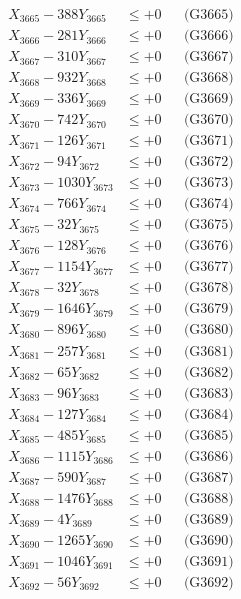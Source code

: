 \documentclass[a4paper,10pt]{article}
\begin{document}
{\begin{align}
X_{3665} - 388Y_{3665} &\leq +0 && \text{(G3665)} \\
X_{3666} - 281Y_{3666} &\leq +0 && \text{(G3666)} \\
X_{3667} - 310Y_{3667} &\leq +0 && \text{(G3667)} \\
X_{3668} - 932Y_{3668} &\leq +0 && \text{(G3668)} \\
X_{3669} - 336Y_{3669} &\leq +0 && \text{(G3669)} \\
X_{3670} - 742Y_{3670} &\leq +0 && \text{(G3670)} \\
\allowbreak
X_{3671} - 126Y_{3671} &\leq +0 && \text{(G3671)} \\
X_{3672} - 94Y_{3672} &\leq +0 && \text{(G3672)} \\
X_{3673} - 1030Y_{3673} &\leq +0 && \text{(G3673)} \\
X_{3674} - 766Y_{3674} &\leq +0 && \text{(G3674)} \\
X_{3675} - 32Y_{3675} &\leq +0 && \text{(G3675)} \\
X_{3676} - 128Y_{3676} &\leq +0 && \text{(G3676)} \\
X_{3677} - 1154Y_{3677} &\leq +0 && \text{(G3677)} \\
X_{3678} - 32Y_{3678} &\leq +0 && \text{(G3678)} \\
X_{3679} - 1646Y_{3679} &\leq +0 && \text{(G3679)} \\
X_{3680} - 896Y_{3680} &\leq +0 && \text{(G3680)} \\
\allowbreak
X_{3681} - 257Y_{3681} &\leq +0 && \text{(G3681)} \\
X_{3682} - 65Y_{3682} &\leq +0 && \text{(G3682)} \\
X_{3683} - 96Y_{3683} &\leq +0 && \text{(G3683)} \\
X_{3684} - 127Y_{3684} &\leq +0 && \text{(G3684)} \\
X_{3685} - 485Y_{3685} &\leq +0 && \text{(G3685)} \\
X_{3686} - 1115Y_{3686} &\leq +0 && \text{(G3686)} \\
X_{3687} - 590Y_{3687} &\leq +0 && \text{(G3687)} \\
X_{3688} - 1476Y_{3688} &\leq +0 && \text{(G3688)} \\
X_{3689} - 4Y_{3689} &\leq +0 && \text{(G3689)} \\
X_{3690} - 1265Y_{3690} &\leq +0 && \text{(G3690)} \\
\allowbreak
X_{3691} - 1046Y_{3691} &\leq +0 && \text{(G3691)} \\
X_{3692} - 56Y_{3692} &\leq +0 && \text{(G3692)} \\

\end{align}}
\end{document}
